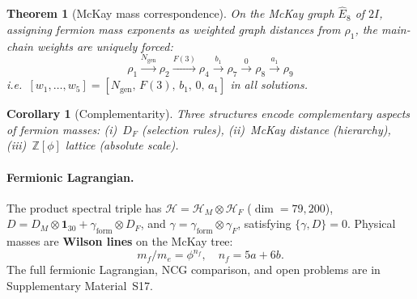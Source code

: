 \documentclass[12pt,a4paper]{article}
\newtheorem{theorem}{Theorem}
\newtheorem{corollary}{Corollary}
\theoremstyle{definition}
\begin{document}
\begin{theorem}[McKay mass correspondence]\label{thm:mckay_mass}
On the McKay graph $\hat{E}_8$ of $2I$, assigning fermion mass exponents as weighted graph distances from $\rho_1$, the main-chain weights are \emph{uniquely forced}:
\begin{equation}\label{eq:main_chain}
\rho_1 \xrightarrow{N_{\mathrm{gen}}} \rho_2 \xrightarrow{F(3)} \rho_4
\xrightarrow{b_1} \rho_7 \xrightarrow{0} \rho_8
\xrightarrow{a_1} \rho_9
\end{equation}
i.e.\ $[w_1,\ldots,w_5] = [N_{\mathrm{gen}},\, F(3),\, b_1,\, 0,\, a_1]$ in all solutions.
\end{theorem}

\begin{corollary}[Complementarity]\label{cor:complementarity}
Three structures encode complementary aspects of fermion masses:
(i)~$D_F$ (selection rules), (ii)~McKay distance (hierarchy), (iii)~$\mathbb{Z}[\phi]$ lattice (absolute scale).
\end{corollary}

\paragraph{Fermionic Lagrangian.}
The product spectral triple has $\mathcal{H} = \mathcal{H}_M \otimes \mathcal{H}_F$ ($\dim = 79{,}200$),
$D = D_M \otimes \mathbf{1}_{30} + \gamma_{\mathrm{form}} \otimes D_F$, and $\gamma = \gamma_{\mathrm{form}} \otimes \gamma_F$, satisfying $\{\gamma, D\} = 0$.
Physical masses are \textbf{Wilson lines} on the McKay tree:
\begin{equation}
m_f/m_e = \phi^{n_f}, \quad n_f = 5a + 6b.
\label{eq:wilson_line}
\end{equation}
The full fermionic Lagrangian, NCG comparison, and open problems are in Supplementary Material~S17.
\end{document}
